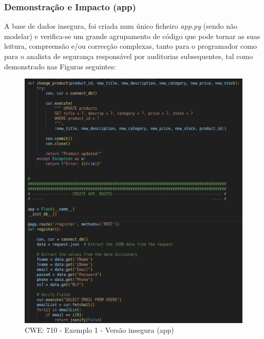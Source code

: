 \subsubsection{Demonstração e Impacto (app)}
A base de dados insegura, foi criada num único ficheiro \textit{app.py} (sendo não modelar) e verifica-se um grande agrupamento de código que pode tornar as suas leitura, compreensão e/ou correcção complexas, tanto para o programador como para o analista de segurança responsável por auditorias subsequentes, tal como demonstrado nas Figuras seguintes:

\begin{figure}[H]
  \centering
  \includegraphics[width=16cm]{images/CWE-710-EX1.png}
  \caption{CWE: 710 - Exemplo 1 - Versão insegura (app)}
  \label{fig:fig:cwe710-ex1}
\end{figure}

